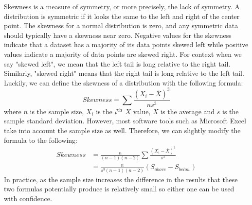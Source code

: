 Skewness is a measure of symmetry, or more precisely, the lack of symmetry. A 
distribution is symmetric if it looks the same to the left and right of the center 
point. The skewness for a normal distribution is zero, and any symmetric data 
should typically have a skewness near zero. Negative values for the skewness 
indicate that a dataset has a majority of its data points skewed left while positive 
values indicate a majority of data points are skewed right. For context when we
say "skewed left", we mean that the left tail is long relative to the right tail. 
Similarly, "skewed right" means that the right tail is long relative to the 
left tail. Luckily, we can define the skewness of a distribution with the 
following formula:
\begin{equation}
    Skewness = \sum{}{} \frac{(X_i-\bar{X})^3}{ns^3}
\end{equation}
where $n$ is the sample size, $X_i$ is the $i\textsuperscript{th}$ $X$ value, $X$ 
is the average and $s$ is the sample standard deviation. However, most software 
tools such as Microsoft Excel take into account the sample size as well. Therefore,
we can slightly modify the formula to the following:
\begin{equation}
    \begin{split}
        Skewness & = \frac{n}{(n-1)(n-2)}\sum{}{} \frac{(X_i-\bar{X})^3}{s^3} \\
        & = \frac{n}{s^3(n-1)(n-2)}(S_{above} - S_{below})
    \end{split}
\end{equation}
In practice, as the sample size increases the difference in the results that these 
two formulas potentially produce is relatively small so either one can be used with 
confidence. 

